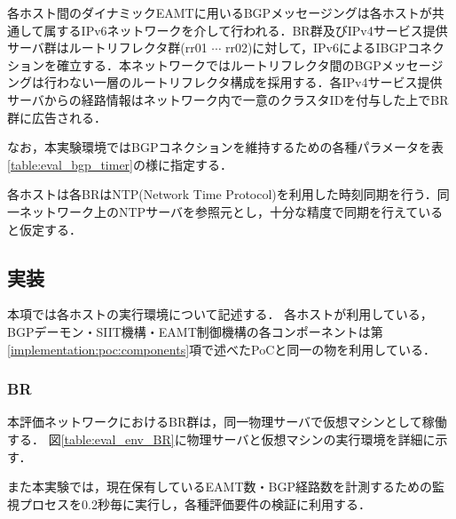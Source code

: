 各ホスト間のダイナミックEAMTに用いるBGPメッセージングは各ホストが共通して属するIPv6ネットワークを介して行われる．BR群及びIPv4サービス提供サーバ群はルートリフレクタ群(rr01 $\cdots$ rr02)に対して，IPv6によるIBGPコネクションを確立する．本ネットワークではルートリフレクタ間のBGPメッセージングは行わない一層のルートリフレクタ構成を採用する．各IPv4サービス提供サーバからの経路情報はネットワーク内で一意のクラスタIDを付与した上でBR群に広告される．

なお，本実験環境ではBGPコネクションを維持するための各種パラメータを表\ref{table:eval_bgp_timer}の様に指定する．

各ホストは各BRはNTP(Network Time Protocol)\cite{RFC5905}を利用した時刻同期を行う．同一ネットワーク上のNTPサーバを参照元とし，十分な精度で同期を行えていると仮定する．


\begin{table}[]
    \label{table:eval_bgp_timer}
    \caption{BGPコネクションで利用したパラメータ}
    \centering
\end{table}

\subsection{実装}
本項では各ホストの実行環境について記述する．
各ホストが利用している，BGPデーモン・SIIT機構・EAMT制御機構の各コンポーネントは第\ref{implementation:poc:components}項で述べたPoCと同一の物を利用している．


\subsubsection{BR}
本評価ネットワークにおけるBR群は，同一物理サーバで仮想マシンとして稼働する．
図\ref{table:eval_env_BR}に物理サーバと仮想マシンの実行環境を詳細に示す．

また本実験では，現在保有しているEAMT数・BGP経路数を計測するための監視プロセスを0.2秒毎に実行し，各種評価要件の検証に利用する．


